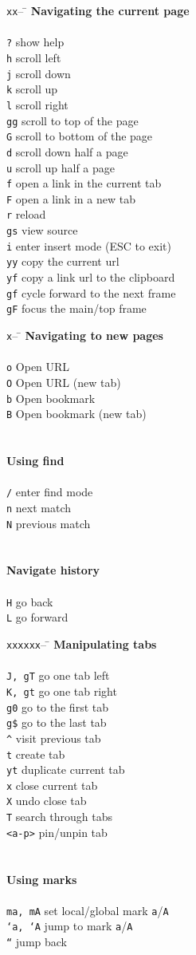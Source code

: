 \documentclass{article}
\newcommand{\narrowtabhead}{\texttt{x}-- \= \kill}
\newcommand{\tabhead}{\texttt{xx}-- \= \kill}
\newcommand{\widetabhead}{\texttt{xxxxxx}-- \= \kill}
\newcommand{\topic}[1]{\textbf{#1} \\ \\}
\newcommand{\cheat}[2]{\texttt{#1} \> #2 \\}
\begin{document}
  \thispagestyle{empty}
  
  \begin{multicols*}{4}
    \begin{tabbing}
      \tabhead
      \topic{Navigating the current page}
      \cheat{?}{show help}
      \cheat{h}{scroll left}
      \cheat{j}{scroll down}
      \cheat{k}{scroll up}
      \cheat{l}{scroll right}
      \cheat{gg}{scroll to top of the page}
      \cheat{G}{scroll to bottom of the page}
      \cheat{d}{scroll down half a page}
      \cheat{u}{scroll up half a page}
      \cheat{f}{open a link in the current tab}
      \cheat{F}{open a link in a new tab}
      \cheat{r}{reload}
      \cheat{gs}{view source}
      \cheat{i}{enter insert mode (ESC to exit)}
      \cheat{yy}{copy the current url}
      \cheat{yf}{copy a link url to the clipboard}
      \cheat{gf}{cycle forward to the next frame}
      \cheat{gF}{focus the main/top frame}
    \end{tabbing}
    
    \columnbreak
    
    \begin{tabbing}
      \narrowtabhead
      \topic{Navigating to new pages}
      \cheat{o}{Open URL}
      \cheat{O}{Open URL (new tab)}
      \cheat{b}{Open bookmark}
      \cheat{B}{Open bookmark (new tab)}
      \\
      \\
      \topic{Using find}
      \cheat{/}{enter find mode}
      \cheat{n}{next match}
      \cheat{N}{previous match}
      \\
      \\
      \topic{Navigate history}
      \cheat{H}{go back}
      \cheat{L}{go forward}
    \end{tabbing}
    
    \columnbreak
    
    \begin{tabbing}
      \widetabhead
      \topic{Manipulating tabs}
      \cheat{J, gT}{go one tab left}
      \cheat{K, gt}{go one tab right}
      \cheat{g0}{go to the first tab}
      \cheat{g\$}{go to the last tab}
      \cheat{\^}{visit previous tab}
      \cheat{t}{create tab}
      \cheat{yt}{duplicate current tab}
      \cheat{x}{close current tab}
      \cheat{X}{undo close tab}
      \cheat{T}{search through tabs}
      \cheat{<a-p>}{pin/unpin tab}
      \\
      \\
      \topic{Using marks}
      \cheat{ma, mA}{set local/global mark \texttt{a}/\texttt{A}}
      \cheat{`a, `A}{jump to mark \texttt{a}/\texttt{A}}
      \cheat{``}{jump back}
    \end{tabbing}
    

\end{multicols*}
\end{document}
